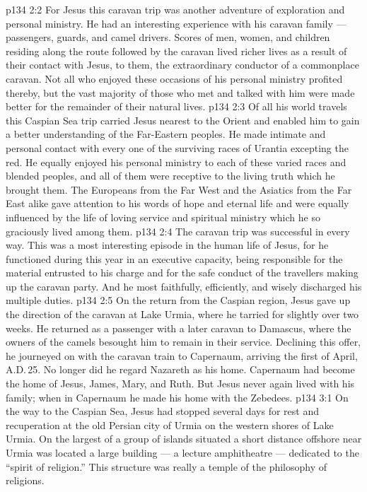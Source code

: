 \vs p134 2:2 For Jesus this caravan trip was another adventure of exploration and personal ministry. He had an interesting experience with his caravan family --- passengers, guards, and camel drivers. Scores of men, women, and children residing along the route followed by the caravan lived richer lives as a result of their contact with Jesus, to them, the extraordinary conductor of a commonplace caravan. Not all who enjoyed these occasions of his personal ministry profited thereby, but the vast majority of those who met and talked with him were made better for the remainder of their natural lives.
\vs p134 2:3 Of all his world travels this Caspian Sea trip carried Jesus nearest to the Orient and enabled him to gain a better understanding of the Far\hyp{}Eastern peoples. He made intimate and personal contact with every one of the surviving races of Urantia excepting the red. He equally enjoyed his personal ministry to each of these varied races and blended peoples, and all of them were receptive to the living truth which he brought them. The Europeans from the Far West and the Asiatics from the Far East alike gave attention to his words of hope and eternal life and were equally influenced by the life of loving service and spiritual ministry which he so graciously lived among them.
\vs p134 2:4 \pc The caravan trip was successful in every way. This was a most interesting episode in the human life of Jesus, for he functioned during this year in an executive capacity, being responsible for the material entrusted to his charge and for the safe conduct of the travellers making up the caravan party. And he most faithfully, efficiently, and wisely discharged his multiple duties.
\vs p134 2:5 On the return from the Caspian region, Jesus gave up the direction of the caravan at Lake Urmia, where he tarried for slightly over two weeks. He returned as a passenger with a later caravan to Damascus, where the owners of the camels besought him to remain in their service. Declining this offer, he journeyed on with the caravan train to Capernaum, arriving the first of April, A.D.\,25. No longer did he regard Nazareth as his home. Capernaum had become the home of Jesus, James, Mary, and Ruth. But Jesus never again lived with his family; when in Capernaum he made his home with the Zebedees.
\vs p134 3:1 On the way to the Caspian Sea, Jesus had stopped several days for rest and recuperation at the old Persian city of Urmia on the western shores of Lake Urmia. On the largest of a group of islands situated a short distance offshore near Urmia was located a large building --- a lecture amphitheatre --- dedicated to the “spirit of religion.” This structure was really a temple of the philosophy of religions.
